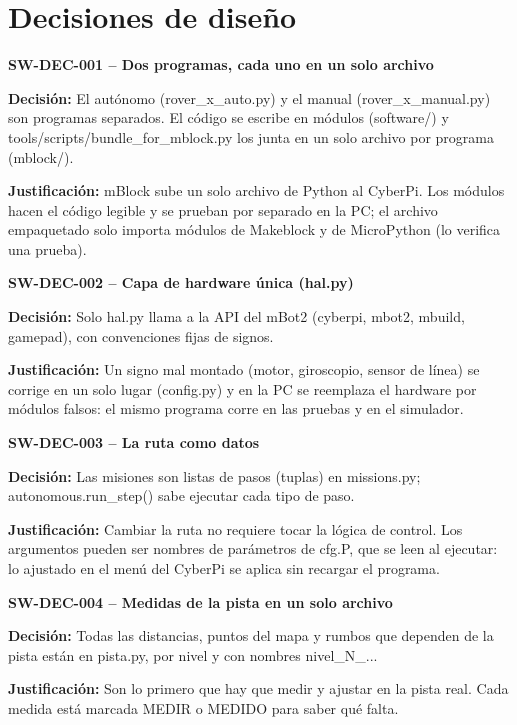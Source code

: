 \section{Decisiones de dise\~no}
\medskip\noindent\textbf{SW-DEC-001 -- Dos programas, cada uno en un solo archivo}\par
\noindent\textbf{Decisi\'on:} El autónomo (rover\_x\_auto.py) y el manual (rover\_x\_manual.py) son programas separados. El código se escribe en módulos (software/) y tools/scripts/bundle\_for\_mblock.py los junta en un solo archivo por programa (mblock/).\par
\noindent\textbf{Justificaci\'on:} mBlock sube un solo archivo de Python al CyberPi. Los módulos hacen el código legible y se prueban por separado en la PC; el archivo empaquetado solo importa módulos de Makeblock y de MicroPython (lo verifica una prueba).\par
\medskip\noindent\textbf{SW-DEC-002 -- Capa de hardware única (hal.py)}\par
\noindent\textbf{Decisi\'on:} Solo hal.py llama a la API del mBot2 (cyberpi, mbot2, mbuild, gamepad), con convenciones fijas de signos.\par
\noindent\textbf{Justificaci\'on:} Un signo mal montado (motor, giroscopio, sensor de línea) se corrige en un solo lugar (config.py) y en la PC se reemplaza el hardware por módulos falsos: el mismo programa corre en las pruebas y en el simulador.\par
\medskip\noindent\textbf{SW-DEC-003 -- La ruta como datos}\par
\noindent\textbf{Decisi\'on:} Las misiones son listas de pasos (tuplas) en missions.py; autonomous.run\_step() sabe ejecutar cada tipo de paso.\par
\noindent\textbf{Justificaci\'on:} Cambiar la ruta no requiere tocar la lógica de control. Los argumentos pueden ser nombres de parámetros de cfg.P, que se leen al ejecutar: lo ajustado en el menú del CyberPi se aplica sin recargar el programa.\par
\medskip\noindent\textbf{SW-DEC-004 -- Medidas de la pista en un solo archivo}\par
\noindent\textbf{Decisi\'on:} Todas las distancias, puntos del mapa y rumbos que dependen de la pista están en pista.py, por nivel y con nombres nivel\_N\_...\par
\noindent\textbf{Justificaci\'on:} Son lo primero que hay que medir y ajustar en la pista real. Cada medida está marcada MEDIR o MEDIDO para saber qué falta.\par
